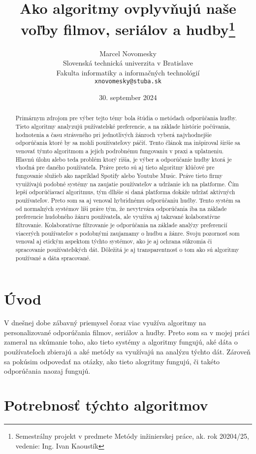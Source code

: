 \documentclass[10pt,twoside,slovak,a4paper]{article}
\title{Ako algoritmy ovplyvňujú naše voľby filmov, seriálov a hudby\thanks{Semestrálny projekt v predmete Metódy inžinierskej práce, ak. rok 20204/25, vedenie: Ing. Ivan Kaoustík}} %
\author{Marcel Novomesky\\[2pt]
	{\small Slovenská technická univerzita v Bratislave}\\
	{\small Fakulta informatiky a informačných technológií}\\
	{\small \texttt{xnovomesky@stuba.sk}}
	}
\date{\small 30. september 2024} %
\begin{document}
\maketitle
\begin{abstract}


Primárnym zdrojom pre výber tejto témy bola štúdia o metódach odporúčania hudby. Tieto algoritmy analyzujú pužívatelské preferencie, a na základe histórie počúvania, hodnotenia a času stráveného pri jednotlivých žánroch vyberá najvhodnejšie odporúčania ktoré by sa mohli používateľovy páčiť. Tento článok \cite{9927924} ma inšpiroval širšie sa venovať týmto algoritmom a jejich podrobnému fungovaniu v praxi a uplatneniu. Hlavnú úlohu alebo teda problém ktorý rišia, je výber a odporúčanie hudby ktorá je vhodná pre daného používateľa. Práve preto sú aj tieto algoritmy klúčové pre fungovanie služieb ako napríklad Spotify alebo Youtube Music. Práve tieto firmy vyuižívajú podobné systémy na zaujatie používateľov a udržanie ich na platforme. Čím lepší odporúčiavací algoritmus, tým dlhšie si daná platforma dokáže udržať aktívných používateľov. Preto som sa aj venoval hybridnému odporúčaniu hudby. Tento systém sa od normalných systémov líši práve tým, že nevytrvára odporúčania iba na základe preferencie hudobného žánru používateľa, ale využíva aj takzvané kolaboratívne filtrovanie. Kolaboratívne filtrovanie je odporúčania na základe analýzy preferencií viacerých používateľov s podobnými zaujamamy o hudbu a žánre. Svoju pozornosť som venoval aj etickým aspektom týchto systémov, ako je aj ochrana súkromia či spracovanie používateľských dát. Dôležitá je aj transparentnosť o tom ako sú algoritmy používané a dáta spracované. 
\end{abstract}



\section{Úvod}
V dnešnej dobe zábavný priemysel čoraz viac využíva algoritmy na personalizované odporúčania filmov, seriálov a hudby. Preto som sa v mojej práci zameral na skúmanie toho, ako tieto systémy a algoritmy fungujú, aké dáta o používateľoch zbierajú a aké metódy sa využívajú na analýzu týchto dát. Zároveň sa pokúsim odpovedať na otázky, ako tieto alogritmy fungujú, či takéto odporúčania naozaj fungujú. 



\section{Potrebnosť týchto algoritmov} \label{nejaka}
\end{document}
